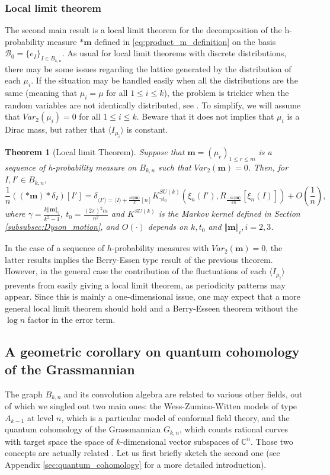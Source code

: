 \documentclass[10pt,11pt]{amsart}%
\newtheorem{theorem}{Theorem}[section]
\begin{document}
\subsubsection{Local limit theorem}
The second main result is a local limit theorem for the decomposition of the h-probability measure $*\mathbf{m}$ defined in \eqref{eq:product_m_definition} on the basis $\mathcal{B}_0=\{e_I\}_{I\in B_{k,n}}$. As usual for local limit theorems with discrete distributions, there may be some issues regarding the lattice generated by the distribution of each $\mu_i$. If the situation may be handled easily when all the distributions are the same (meaning that $\mu_i=\mu$ for all $1\leq i\leq k$), the problem is trickier when the random variables are not identically distributed, see \cite{Mu}. To simplify, we will assume that $Var_2(\mu_i)=0$ for all $1\leq i\leq k$. Beware that it does not implies that $\mu_i$ is a Dirac mass, but rather that $\langle I_{\mu_i}\rangle$ is constant. 

\begin{theorem}[Local limit Theorem]\label{thm:local-limit}
Suppose that $\mathbf{m}=(\mu_r)_{1\leq r\leq m}$ is a sequence of h-probability measure on $ B_{k,n}$ such that $Var_{2}(\mathbf{m})=0$. Then, for $I,I'\in B_{k,n}$,
$$\frac{1}{n}\left(\left(\ast \mathbf{m}\right)\ast \delta_I\right)[I']= \delta_{\langle I'\rangle=\langle I\rangle+\frac{m\langle\mathbf{m}\rangle}{k}[n]}K^{SU(k)}_{\gamma t_0}\left(\xi_{n}(I'),R_{\frac{- m\langle\mathbf{m}\rangle}{kn}}\left[\xi_n\left(I\right)\right]\right)+O\left(\frac{1}{n}\right),$$
where $\gamma=\frac{k\Vert \mathbf{m}\Vert_2}{k^2-1}$, $t_0=\frac{(2\pi)^2m}{n^2}$ and $K^{SU(k)}$ is the Markov kernel defined in Section \ref{subsubsec:Dyson_motion}, and $O(\cdot)$ depends on $k, t_0$ and $\Vert \mathbf{m}\Vert_i, i=2,3$.
\end{theorem}
In the case of a sequence of $h$-probability measures with $Var_2(\mathbf{m})=0$, the latter results implies the Berry-Essen type result of the previous theorem. However, in the general case the contribution of the fluctuations of each $\langle I_{\mu_i}\rangle$ prevents from easily giving a local limit theorem, as periodicity patterns may appear. Since this is mainly a one-dimensional issue, one may expect that a more general local limit theorem should hold and a Berry-Esseen theorem without the $\log n$ factor in the error term.

\subsection{A geometric corollary on quantum cohomology of the Grassmannian}
The graph $B_{k,n}$ and its convolution algebra are related to various other fields, out of which we singled out two main ones: the Wess-Zumino-Witten models of type $A_{k-1}$ at level $n$, which is a particular model of conformal field theory, and the quantum cohomology of the Grassmannian $G_{k,n}$, which counts rational curves with target space the space of $k$-dimensional vector subspaces of $\mathbb{C}^n$. Those two concepts are actually related \cite{G,GK,KS}. Let us first briefly sketch the second one (see Appendix \ref{sec:quantum_cohomology} for a more detailed introduction). 
\end{document}
